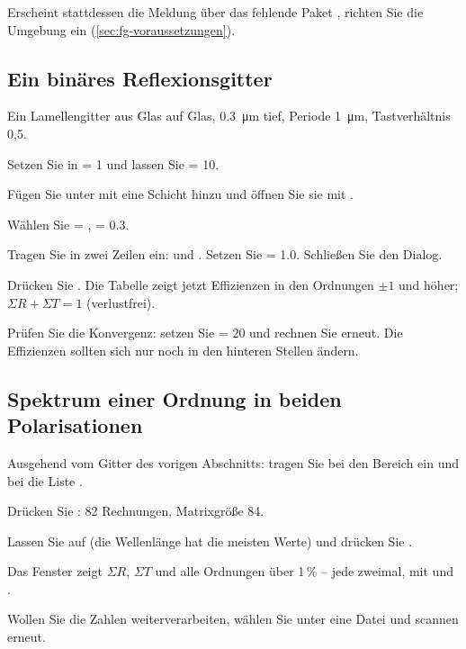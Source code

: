 Erscheint stattdessen die Meldung über das fehlende Paket , richten Sie die
Umgebung ein (\autoref{sec:fg-voraussetzungen}).

\subsection{Ein binäres Reflexionsgitter}\label{sec:fg-ablauf-lamellen}

Ein Lamellengitter aus Glas auf Glas, \qty{0.3}{\micro\metre} tief, Periode
\qty{1}{\micro\metre}, Tastverhältnis 0,5.

\begin{schritte}
  \item Setzen Sie in   = 1 und lassen Sie  = 10.
  \item Fügen Sie unter  mit  eine Schicht hinzu und öffnen Sie
    sie mit .
  \item Wählen Sie  = ,  = 0.3.
  \item Tragen Sie in  zwei Zeilen ein:  und
    . Setzen Sie  = 1.0. Schließen Sie den Dialog.
  \item Drücken Sie . Die Tabelle zeigt jetzt Effizienzen in den Ordnungen $\pm 1$ und
    höher; $\Sigma R + \Sigma T = 1$ (verlustfrei).
  \item Prüfen Sie die Konvergenz: setzen Sie  = 20 und rechnen Sie erneut. Die
    Effizienzen sollten sich nur noch in den hinteren Stellen ändern.
\end{schritte}

\subsection{Spektrum einer Ordnung in beiden Polarisationen}

\begin{schritte}
  \item Ausgehend vom Gitter des vorigen Abschnitts: tragen Sie bei \gui{$\lambda$ /
    \si{\micro\metre}} den Bereich  ein und bei  die Liste
    .
  \item Drücken Sie : 82 Rechnungen, Matrixgröße 84.
  \item Lassen Sie  auf  (die Wellenlänge hat die meisten Werte) und drücken
    Sie .
  \item Das Fenster  zeigt $\Sigma R$, $\Sigma T$ und alle Ordnungen über 1\,\% -- jede
    zweimal, mit  und .
  \item Wollen Sie die Zahlen weiterverarbeiten, wählen Sie unter  eine Datei
    und scannen erneut.
\end{schritte}

